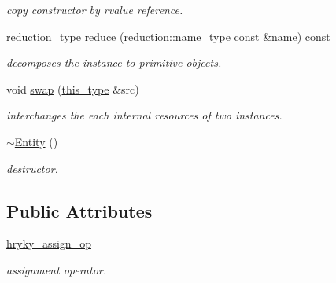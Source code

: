 \begin{DoxyCompactItemize}
\begin{DoxyCompactList}\small\item\em copy constructor by rvalue reference. \end{DoxyCompactList}\item 
\hypertarget{classhryky_1_1http_1_1seconds_1_1_entity_a3f4efe0188f6c81e708f81fcde7cf679}{\hyperlink{namespacehryky_a343a9a4c36a586be5c2693156200eadc}{reduction\-\_\-type} \hyperlink{classhryky_1_1http_1_1seconds_1_1_entity_a3f4efe0188f6c81e708f81fcde7cf679}{reduce} (\hyperlink{namespacehryky_1_1reduction_ac686c30a4c8d196bbd0f05629a6b921f}{reduction\-::name\-\_\-type} const \&name) const }\label{classhryky_1_1http_1_1seconds_1_1_entity_a3f4efe0188f6c81e708f81fcde7cf679}

\begin{DoxyCompactList}\small\item\em decomposes the instance to primitive objects. \end{DoxyCompactList}\item 
\hypertarget{classhryky_1_1http_1_1seconds_1_1_entity_aa6355c63a409960c53ffc609ae466967}{void \hyperlink{classhryky_1_1http_1_1seconds_1_1_entity_aa6355c63a409960c53ffc609ae466967}{swap} (\hyperlink{classhryky_1_1http_1_1seconds_1_1_entity_a1a69109f5c7e9998e36e4a6eae23d74d}{this\-\_\-type} \&src)}\label{classhryky_1_1http_1_1seconds_1_1_entity_aa6355c63a409960c53ffc609ae466967}

\begin{DoxyCompactList}\small\item\em interchanges the each internal resources of two instances. \end{DoxyCompactList}\item 
\hypertarget{classhryky_1_1http_1_1seconds_1_1_entity_a80eaea4353c48d3385378016f20069d8}{\hyperlink{classhryky_1_1http_1_1seconds_1_1_entity_a80eaea4353c48d3385378016f20069d8}{$\sim$\-Entity} ()}\label{classhryky_1_1http_1_1seconds_1_1_entity_a80eaea4353c48d3385378016f20069d8}

\begin{DoxyCompactList}\small\item\em destructor. \end{DoxyCompactList}\end{DoxyCompactItemize}
\subsection*{Public Attributes}
\begin{DoxyCompactItemize}
\item 
\hypertarget{classhryky_1_1http_1_1seconds_1_1_entity_addf62178d9ac1df309800eaeef020372}{\hyperlink{classhryky_1_1http_1_1seconds_1_1_entity_addf62178d9ac1df309800eaeef020372}{hryky\-\_\-assign\-\_\-op}}\label{classhryky_1_1http_1_1seconds_1_1_entity_addf62178d9ac1df309800eaeef020372}

\begin{DoxyCompactList}\small\item\em assignment operator. \end{DoxyCompactList}\end{DoxyCompactItemize}


